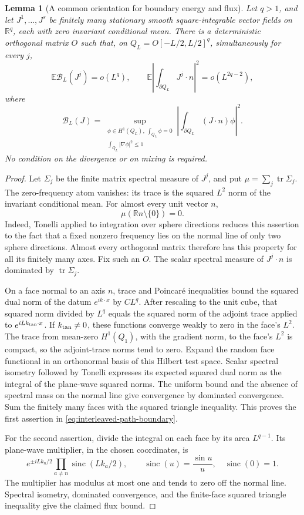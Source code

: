 \documentclass[11pt,reqno]{amsart}
\newtheorem{lemma}[theorem]{Lemma}
\theoremstyle{definition}
\theoremstyle{remark}
\numberwithin{equation}{section}
\newcommand{\R}{\mathbb R}
\newcommand{\E}{\mathbb E}
\begin{document}
\begin{lemma}[A common orientation for boundary energy and flux]
\label{lem:generic-current-boundary}
Let $q>1$, and let $J^1,\ldots,J^s$ be finitely many stationary smooth
square-integrable vector fields on $\R^q$, each with zero invariant
conditional mean. There is a deterministic orthogonal matrix $O$ such
that, on $Q_L=O[-L/2,L/2]^q$, simultaneously for every $j$,
\begin{equation}
 \E\mathcal B_L(J^j)=o(L^q),\qquad
 \E\left|\int_{\partial Q_L}J^j\cdot n\right|^2
       =o(L^{2q-2}),
 \label{eq:interleaved-path-boundary}
\end{equation}
where
\[
 \mathcal B_L(J)=
 \sup_{\substack{\phi\in H^1(Q_L),\ \int_{Q_L}\phi=0\\
                         \int_{Q_L}|\nabla\phi|^2\le1}}
 \left|\int_{\partial Q_L}(J\cdot n)\phi\right|^2.
\]
No condition on the divergence or on mixing is required.
\end{lemma}
\begin{proof}
Let $\Sigma_j$ be the finite matrix spectral measure of $J^j$, and put
$\mu=\sum_j\operatorname{tr}\Sigma_j$. The zero-frequency atom vanishes:
its trace is the squared $L^2$ norm of the invariant conditional mean.
For almost every unit vector $n$,
\[
                    \mu(\R n\setminus\{0\})=0.
\]
Indeed, Tonelli applied to integration over sphere directions reduces
this assertion to the fact that a fixed nonzero frequency lies on the
normal line of only two sphere directions. Almost every orthogonal
matrix therefore has this property for all its finitely many axes.
Fix such an $O$. The scalar spectral measure of $J^j\cdot n$ is
dominated by $\operatorname{tr}\Sigma_j$.

On a face normal to an axis $n$, trace and Poincar\'e inequalities bound
the squared dual norm of the datum $e^{ik\cdot x}$ by $CL^q$.
After rescaling to the unit cube, that squared norm divided by $L^q$
equals the squared norm of the adjoint trace applied to
$e^{iLk_{\rm tan}\cdot x}$. If $k_{\rm tan}\ne0$, these functions
converge weakly to zero in the face's $L^2$. The trace from mean-zero
$H^1(Q_1)$, with the gradient norm, to the face's $L^2$ is compact,
so the adjoint-trace norms tend to zero.
Expand the random face functional in an orthonormal basis of this
Hilbert test space. Scalar spectral isometry followed by Tonelli
expresses its expected squared dual norm as the integral of the
plane-wave squared norms. The uniform bound and the absence of spectral
mass on the normal line give convergence by dominated convergence.
Sum the finitely many faces with the squared triangle inequality.
This proves the first assertion in
\eqref{eq:interleaved-path-boundary}.

For the second assertion, divide the integral on each face by its area
$L^{q-1}$. Its plane-wave multiplier, in the chosen coordinates, is
\[
 e^{\pm iLk_n/2}
       \prod_{a\ne n}\operatorname{sinc}(Lk_a/2),
 \qquad \operatorname{sinc}(u)=\frac{\sin u}{u},\quad
 \operatorname{sinc}(0)=1.
\]
The multiplier has modulus at most one and tends to zero off the
normal line. Spectral isometry, dominated convergence, and the
finite-face squared triangle inequality give the claimed flux bound.
\end{proof}
\end{document}
